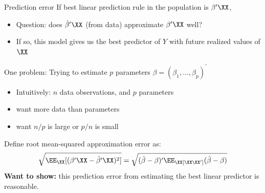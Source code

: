 \documentclass[compress, 8pt]{beamer}
\begin{document}
\begin{frame}{Prediction error}
    If best linear prediction rule in the population is $\beta^\prime \XX$, 
    \begin{itemize}
        \item Question: does $\hat{\beta}^\prime \XX$ (from data) approximate $\beta^\prime \XX$ well?
        \item If so, this model gives us the best predictor of $Y$ with future realized values of $\XX$
    \end{itemize}

    \vspace{2ex}
    One problem: Trying to estimate $p$ parameters $\beta = (\beta_1, \dots, \beta_p)^\prime$ 
    \begin{itemize}
        \item Intuitively: $n$ data observations, and $p$ parameters
        \item [$\implies$] want more data than parameters
        \item [$\implies$] want $n/p$ is large or $p/n$ is small
    \end{itemize}
    Define root mean-squared approximation error as:
    \begin{equation*}
        \sqrt{\EE_\XX [(\beta^\prime \XX - \hat{\beta}^\prime \XX)^2]} = 
        \sqrt{(\hat{\beta} - \beta)^\prime \EE_\XX [\XX \XX^\prime] (\hat{\beta} - \beta)}
    \end{equation*}
    \textbf{Want to show:} this prediction error from estimating the best linear predictor is reasonable.

    
\end{frame}
\end{document}
